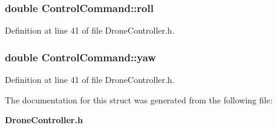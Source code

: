 \subsubsection[{roll}]{\setlength{\rightskip}{0pt plus 5cm}double Control\-Command\-::roll}\label{structControlCommand_a17e0bf89d482a85c765e350fb46c5c0e}


Definition at line 41 of file Drone\-Controller.\-h.

\subsubsection[{yaw}]{\setlength{\rightskip}{0pt plus 5cm}double Control\-Command\-::yaw}\label{structControlCommand_a9c00a1376532e1986b27f85e44f39f93}


Definition at line 41 of file Drone\-Controller.\-h.



The documentation for this struct was generated from the following file\-:\begin{DoxyCompactItemize}
\item 
{\bf Drone\-Controller.\-h}\end{DoxyCompactItemize}
